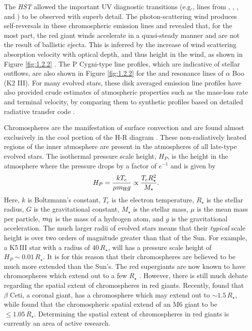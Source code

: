 The \textit{HST} allowed the important UV diagnostic transitions (e.g., lines from , , , and ) to be observed with superb detail. The photon-scattering wind produces self-reversals in these chromospheric emission lines and revealed that, for the most part, the red giant winds accelerate in a quasi-steady manner and are not the result of ballistic ejecta. This is inferred by the increase of wind scattering absorption velocity with optical depth, and thus height in the wind, as shown in Figure \ref{fig:1.2.2} \citep{carpenter_1999}. The P Cygni-type line profiles, which are indicative of stellar outflows, are also shown in Figure \ref{fig:1.2.2} for the  and  resonance lines of $\alpha$ Boo (K2 III). For many evolved stars, these disk averaged emission line profiles have also provided crude estimates of atmospheric properties such as the mass-loss rate and terminal velocity, by comparing them to synthetic profiles based on detailed radiative transfer code \citep[e.g.,][]{robinson_1998}.

Chromospheres are the manifestation of surface convection and are found almost exclusively in the cool portion of the H-R diagram \citep{ayres_2010b}. These non-radiatively  heated regions of the inner atmosphere are present in the atmospheres of all late-type evolved stars. The isothermal pressure scale height, $H_{P}$, is the height in the atmosphere where the pressure drops by a factor of $e^{-1}$ and is given by
\begin{equation}
H_{P}=\frac{kT_e}{\mu m_{\rm{H}} g} \propto \frac{T_{e}R_{\star}^2}{M_{\star}}.
\end{equation}
Here, $k$ is Boltzmann's constant, $T_{e}$ is the electron temperature, $R_{\star}$ is the stellar radius, $G$ is the gravitational constant, $M_{\star}$ is the stellar mass, $\mu$ is the mean mass per particle, $m_{\rm{H}}$ is the mass of a hydrogen atom, and $g$ is the gravitational acceleration. The much larger radii of evolved stars means that their \textit{typical} scale height is over two orders of magnitude greater than that of the Sun. For example, a K5\,III star with a radius of $40\,R_{\star}$, will has a pressure scale height of $H_{P} \sim 0.01\,R_{\star}$. It is for this reason that their chromospheres are believed to be much more extended than the Sun's. The red supergiants are now known to have chromospheres which extend out to a few $R_{\star}$ \citep{lim_1998, harper_2001}. However, there is still much debate regarding the spatial extent of chromospheres in red giants. Recently, \cite{berio_2011} found that $\beta$ Ceti, a coronal giant, has a chromosphere which may extend out to $\sim 1.5\,R_{\star}$, while \cite{luttermoser_1994} found that the chromospheric spatial extend of an M6 giant to be $\le 1.05\,R_{\star}$. Determining the spatial extent of chromospheres in red giants is currently an area of active research.


